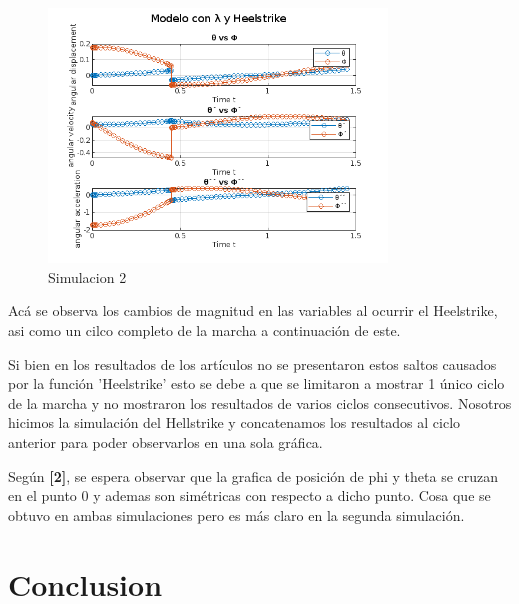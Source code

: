 \documentclass[journal,transmag]{IEEEtran}
\begin{document}
\begin{figure}[!h]
		\center
		\includegraphics[width=9cm]{imgs/s2.png}
		\caption{Simulacion 2}
		\label{2}
\end{figure}

Acá se observa los cambios de magnitud en las variables al ocurrir el Heelstrike, asi como un cilco completo de la marcha a continuación de este. 

Si bien en los resultados de los artículos no se presentaron estos saltos causados por la función 'Heelstrike' esto se debe a que se limitaron a mostrar 1 único ciclo de la marcha y no mostraron los resultados de varios ciclos consecutivos. Nosotros hicimos la simulación del Hellstrike y concatenamos los resultados al ciclo anterior para poder observarlos en una sola gráfica.

Según \textbf{[2]}, se espera observar que la grafica de posición de phi y theta se cruzan en el punto 0 y ademas son simétricas con respecto a dicho punto. Cosa que se obtuvo en ambas simulaciones pero es más claro en la segunda simulación. 


  


\section{Conclusion}
	
\end{document}
